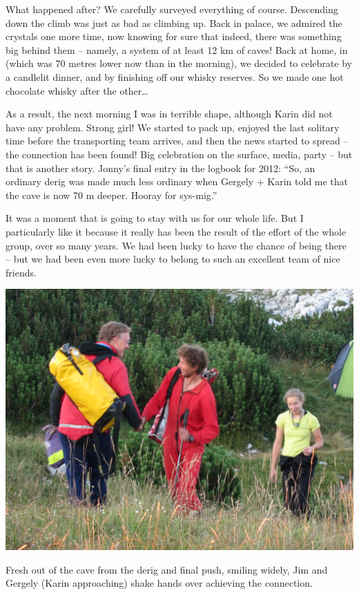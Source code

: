 What happened after? We carefully surveyed everything of course.
Descending down the  climb was just as bad as climbing up.
Back in  palace, we admired the crystals one more time,
now knowing for sure that indeed, there was something big behind them --
namely, a system of at least 12 km of caves! Back at home, in
 (which was 70 metres lower now than in the morning), we
decided to celebrate by a candlelit dinner, and by finishing off our
whisky reserves. So we made one hot chocolate whisky after the
other\ldots{}

As a result, the next morning I was in terrible shape,
although Karin did not have any problem. Strong girl! We started to pack
up, enjoyed the last solitary time before the transporting team arrives,
and then the news started to spread -- the connection has been found!
Big celebration on the surface, media, party -- but that is another
story. Jonny's final entry in the logbook for 2012: ``So, an ordinary
derig was made much less ordinary when Gergely + Karin told me that the
cave is now 70 m deeper. Hooray for sys-mig.''

It was a moment that is going to stay with us for our whole life. But I
particularly like it because it really has been the result of the effort
of the whole group, over so many years. We had been lucky to have the
chance of being there -- but we had been even more lucky to belong to
such an excellent team of nice friends.


\begin{pagefigure}
\checkoddpage \ifoddpage \forcerectofloat \else \forceversofloat \fi
   \centering
\includegraphics[width = \textwidth]{2012/sanje_za_duso/2012-08-14-1852-JanaCarga-360--orig.jpg}
\caption{Fresh out of the cave from the derig and final push, smiling widely, Jim and Gergely (Karin approaching) shake hands over achieving the connection. } \label{connection handshake 1}
\end{pagefigure}